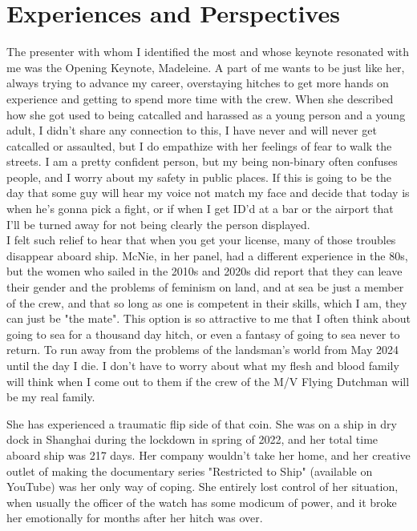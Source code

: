 \documentclass{article}
\begin{document}
\section*{Experiences and Perspectives}
The presenter with whom I identified the most and whose keynote resonated with me was the Opening Keynote, Madeleine. A part of me wants to be just like her, always trying to advance my career, overstaying hitches to get more hands on experience and getting to spend more time with the crew. When she described how she got used to being catcalled and harassed as a young person and a young adult, I didn't share any connection to this, I have never and will never get catcalled or assaulted, but I do empathize with her feelings of fear to walk the streets. I am a pretty confident person, but my being non-binary often confuses people, and I worry about my safety in public places. If this is going to be the day that some guy will hear my voice not match my face and decide that today is when he's gonna pick a fight, or if when I get ID'd at a bar or the airport that I'll be turned away for not being clearly the person displayed.\\ I felt such relief to hear that when you get your license, many of those troubles disappear aboard ship. McNie, in her panel, had a different experience in the 80s, but the women who sailed in the 2010s and 2020s did report that they can leave their gender and the problems of feminism on land, and at sea be just a member of the crew, and that so long as one is competent in their skills, which I am, they can just be "the mate". This option is so attractive to me that I often think about going to sea for a thousand day hitch, or even a fantasy of going to sea never to return. To run away from the problems of the landsman's world from May  2024 until the day I die. I don't have to worry about what my flesh and blood family will think when I come out to them if the crew of the M/V Flying Dutchman will be my real family.

She has experienced a traumatic flip side of that coin. She was on a ship in dry dock in Shanghai during the lockdown in spring of 2022, and her total time aboard ship was 217 days. Her company wouldn't take her home, and her creative outlet of making the documentary series "Restricted to Ship" (available on YouTube) was her only way of coping. She entirely lost control of her situation, when usually the officer of the watch has some modicum of power, and it broke her emotionally for months after her hitch was over.
\end{document}
